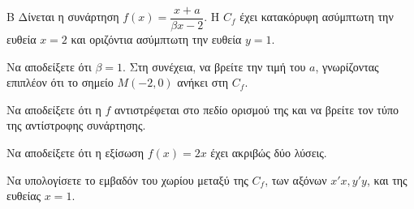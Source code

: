 \begin{thema}{Β}
Δίνεται η συνάρτηση $f(x) = \dfrac{x+a}{\beta x-2}$. Η $C_f$ έχει κατακόρυφη ασύμπτωτη την ευθεία $x=2$ και οριζόντια ασύμπτωτη την ευθεία $y=1$.
\begin{erwthma}
  \item Να αποδείξετε ότι $\beta=1$. Στη συνέχεια, να βρείτε την τιμή του $a$, γνωρίζοντας επιπλέον ότι το σημείο $M(-2, 0)$ ανήκει στη $C_f$.
  \item Να αποδείξετε ότι η $f$ αντιστρέφεται στο πεδίο ορισμού της και να βρείτε τον τύπο της αντίστροφης συνάρτησης.
  \item Να αποδείξετε ότι η εξίσωση $f(x) = 2x$ έχει ακριβώς δύο λύσεις.
  \item Να υπολογίσετε το εμβαδόν του χωρίου μεταξύ της $C_f$, των αξόνων $x'x, y'y$, και της ευθείας $x=1$.
\end{erwthma}
\end{thema}
